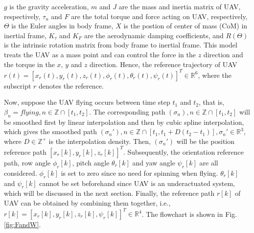 \documentclass{ieeeaccess}
\begin{document}
$g$ is the gravity acceleration, $m$ and $J$ are the mass and inertia matrix of UAV, respectively, $\tau_u$ and $F$ are the total torque and force acting on UAV, respectively, $\Theta$ is the Euler angles in body frame, $X$ is the postion of center of mass (CoM) in inertial frame, $K_\tau$ and $K_F$ are the aerodynamic damping coefficients, and $R(\Theta)$ is the intrinsic rotation matrix from body frame to inertial frame. This model treats the UAV as a mass point and can control the force in the $z$ direction and the torque in the $x$, $y$ and $z$ direction. Hence, the reference trajectory of UAV $r(t)=[x_r(t),y_r(t),z_r(t),\phi_r(t),\theta_r(t),\psi_r(t)]^T\in\mathbb{R}^{6}$, where the subscript $r$ denotes the reference.

Now, suppose the UAV flying occurs between time step $t_1$ and $t_2$, that is, $\beta_n=\mathit{flying}, n\in\mathbb{Z}\cap[t_1,t_2]$. The corresponding path $(\sigma_n), n\in\mathbb{Z}\cap[t_1,t_2]$ will be smoothed first by linear interpolation and then by cubic spline interpolation, which gives the smoothed path $(\sigma_n'), n\in\mathbb{Z}\cap[t_1,t_1+D(t_2-t_1)], \sigma_n'\in\mathbb{R}^3$, where $D\in\mathbb{Z}^+$ is the interpolation density. Then, $(\sigma_n')$ will be the position reference path $[
    x_r[k], y_r[k], z_r[k]
]^T$. Subsequently, the orientation reference path, row angle $\phi_r[k]$, pitch angle $\theta_r[k]$ and yaw angle $\psi_r[k]$ are all considered. $\phi_r[k]$ is set to zero since no need for spinning when flying. $\theta_r[k]$ and $\psi_r[k]$ cannot be set beforehand since UAV is an underactuated system, which will be discussed in the next section. Finally, the reference path $r[k]$ of UAV can be obtained by combining them together, i.e., $r[k] = [
    x_r[k], y_r[k], z_r[k], \psi_r[k]
]^T\in\mathbb{R}^{4}$. The flowchart is shown in Fig. \ref{fig:FandW}.


\end{document}
